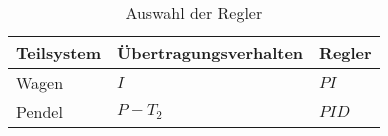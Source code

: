 

\begin{table}[h]
  \caption{Auswahl der Regler}
  \label{reglerTab}
  \renewcommand{\arraystretch}{1.2}
  \centering
  \sffamily
  \begin{footnotesize}
    \begin{tabular}{l l l}
    \toprule
    \textbf{Teilsystem} & \textbf{Übertragungsverhalten} & \textbf{Regler}\\
    \midrule
    Wagen	&	$I$	& 	$PI$\\
    Pendel	&	$P-T_2$		&	$PID$\\
    \bottomrule
    \end{tabular}
  \end{footnotesize}
  \rmfamily
\end{table}